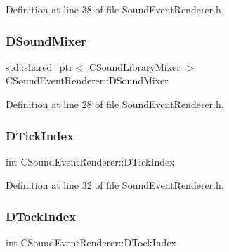 Definition at line 38 of file Sound\+Event\+Renderer.\+h.

\hypertarget{classCSoundEventRenderer_a5abf598a7e8783d9cc78e0d33a65c9c2}{}\label{classCSoundEventRenderer_a5abf598a7e8783d9cc78e0d33a65c9c2} 
\subsubsection{\texorpdfstring{D\+Sound\+Mixer}{DSoundMixer}}
{\footnotesize\ttfamily std\+::shared\+\_\+ptr$<$ \hyperlink{classCSoundLibraryMixer}{C\+Sound\+Library\+Mixer} $>$ C\+Sound\+Event\+Renderer\+::\+D\+Sound\+Mixer\hspace{0.3cm}{\ttfamily [protected]}}



Definition at line 28 of file Sound\+Event\+Renderer.\+h.

\hypertarget{classCSoundEventRenderer_a810ef7feb31ba13f89919ed78d0cee25}{}\label{classCSoundEventRenderer_a810ef7feb31ba13f89919ed78d0cee25} 
\subsubsection{\texorpdfstring{D\+Tick\+Index}{DTickIndex}}
{\footnotesize\ttfamily int C\+Sound\+Event\+Renderer\+::\+D\+Tick\+Index\hspace{0.3cm}{\ttfamily [protected]}}



Definition at line 32 of file Sound\+Event\+Renderer.\+h.

\hypertarget{classCSoundEventRenderer_a93c4c050a9840199ab026018c107e62c}{}\label{classCSoundEventRenderer_a93c4c050a9840199ab026018c107e62c} 
\subsubsection{\texorpdfstring{D\+Tock\+Index}{DTockIndex}}
{\footnotesize\ttfamily int C\+Sound\+Event\+Renderer\+::\+D\+Tock\+Index\hspace{0.3cm}{\ttfamily [protected]}}




